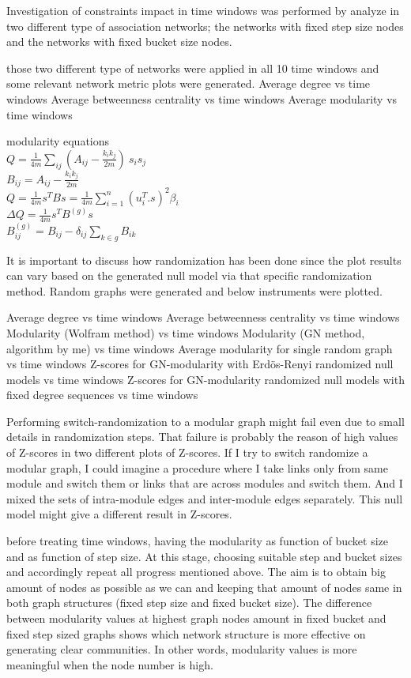 Investigation of constraints impact in time windows was performed by analyze in two different type of association networks; the networks with fixed step size nodes and the networks with fixed bucket size nodes.

those two different type of networks were applied in all 10 time windows and some relevant network metric plots were generated. 
Average degree vs time windows
Average betweenness centrality vs time windows
Average modularity vs time windows

modularity equations\\
$Q = \frac {1} {4 m}\sum_ {ij} (A_{ij} - \frac {k_{i} k_{j}}{2 m}) \
s_{i} s_{j}$\\
$B_{ij} = A_{ij} - \frac {k_ {i} k_ {j}} {2 m}$\\
$Q = \frac {1} {4 m} s^{T} Bs = \frac {1} {4 m}\sum_ {i = 
	1}^{n} (u_ {i}^{T} . s)^{2}\beta_ {i}$\\
$\Delta Q = \frac {1} {4 m} s^{T} B^{(g)} s$\\
$B_{ij}^{(g)} = B_{ij} - \delta_{ij}\sum_ {k\in g} B_{ik}$

It is important to discuss how randomization has been done since the plot results can vary based on the generated null model via that specific randomization method. 
Random graphs were generated and below instruments were plotted.

Average degree vs time windows
Average betweenness centrality vs time windows
Modularity (Wolfram method) vs time windows
Modularity (GN method, algorithm by me) vs time windows
Average modularity for single random graph vs time windows
Z-scores for GN-modularity with Erdös-Renyi randomized null models vs time windows
Z-scores for GN-modularity randomized null models with fixed degree sequences vs time windows

Performing switch-randomization to a modular graph might fail even due to small details in randomization steps. That failure is probably the reason of high values of Z-scores in two different plots of Z-scores. If I try to switch randomize a modular graph, I could imagine a procedure where I take links only from same module and switch them or links that are across modules and switch them. And I mixed the sets of intra-module edges and inter-module edges separately. This null model might give a different result in Z-scores.

before treating time windows, having the modularity as function of bucket size and as function of step size. At this stage, choosing suitable step and bucket sizes and accordingly repeat all progress mentioned above. The aim is to obtain big amount of nodes as possible as we can and keeping that amount of nodes same in both graph structures (fixed step size and fixed bucket size). The difference between modularity values at highest graph nodes amount in fixed bucket and fixed step sized graphs shows which network structure is more effective on generating clear communities. In other words, modularity values is more meaningful when the node number is high.


